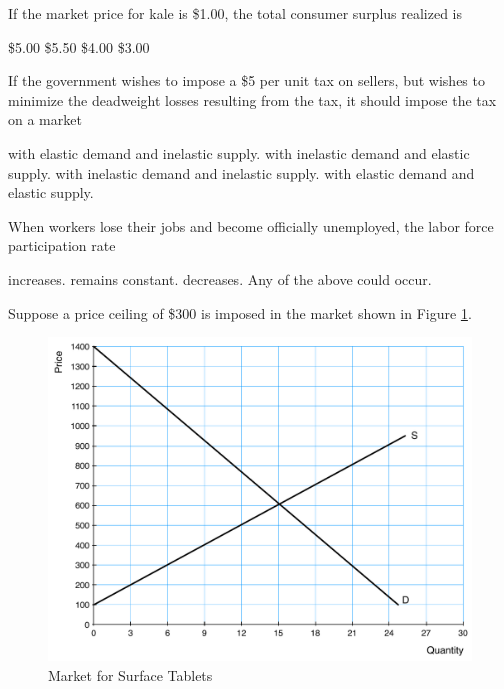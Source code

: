 \documentclass[addpoints,11pt]{exam}
\theoremstyle{definition}
\begin{document}
\begin{questions}
\begin{table}[H]
	\end{table} 
	
	If the market price for kale is \$1.00, the total consumer surplus realized is
	
	\begin{choices}
		\choice \$5.00
		\CorrectChoice \$5.50
		\choice \$4.00
		\choice \$3.00
	\end{choices}
	
	\question If the government wishes to impose a \$5 per unit tax on sellers, but wishes to minimize the deadweight losses resulting from the tax, it should impose the tax on a market 
	
	\begin{choices}
		\choice with elastic demand and inelastic supply.
		\choice with inelastic demand and elastic supply.
		\CorrectChoice with inelastic demand and inelastic supply.
		\choice with elastic demand and elastic supply.
	\end{choices}

	\question When workers lose their jobs and become officially unemployed, the labor force participation rate
	
	\begin{choices}
		\choice increases. 
		\CorrectChoice remains constant.
		\choice decreases.
		\choice Any of the above could occur.
	\end{choices}
	
	
	\question Suppose a price ceiling of \$300 is imposed in the market shown in Figure \ref{MC42}.
	
	
	\begin{figure}[H]
		\centering
		\includegraphics[scale=.40]{Final_MC42.pdf}
		\caption{Market for Surface Tablets}
		\label{MC42}
	\end{figure}
	

\end{questions}
\end{document}
